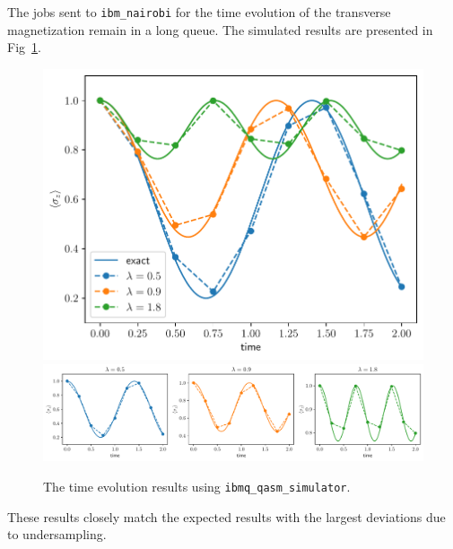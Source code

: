 \documentclass[12pt]{article}
\begin{document}
  The jobs sent to \texttt{ibm\_nairobi} for the time evolution of the transverse magnetization remain in a long queue. The simulated results are presented in Fig~\ref{fig:time-evolution-mangetization}.
  \begin{figure}
      \centering
      \includegraphics[width=\textwidth]
        {images/time-evolution-magnetization-test}
      \includegraphics[width=\textwidth]
        {images/time-evolution-magnetization-separate-test}
      \caption{The time evolution results using \texttt{ibmq\_qasm\_simulator}.%
        \label{fig:time-evolution-mangetization}}
  \end{figure}
  These results closely match the expected results with the largest deviations due to undersampling.

  \printbibliography
\end{document}
